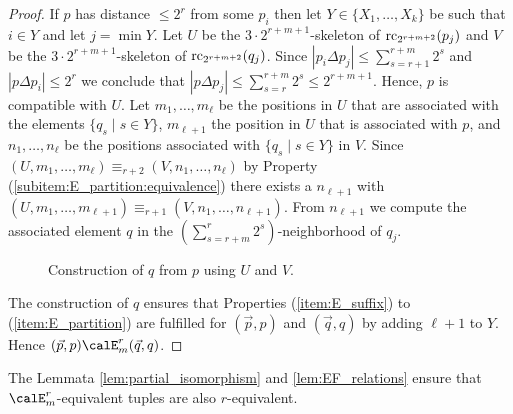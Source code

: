 \begin{proof}
	
	If $p$ has distance $\leq 2^{r}$ from some $p_i$ then let $Y\in \{X_1,\ldots,X_k\}$ be such that $i\in Y$ and let $j=\min Y$. Let $U$ be the $3\cdot 2^{r+m+1}$-skeleton of $\operatorname{rc}_{2^{r+m+2}}(p_j)$ and 
	$V$ be the $3\cdot 2^{r+m+1}$-skeleton of $\operatorname{rc}_{2^{r+m+2}}(q_j)$.
	Since $|p_i\Delta p_j| \leq \sum_{s=r+1}^{r+m} 2^s$ and $|p\Delta p_i| \leq 2^r$ we conclude that $|p\Delta p_j| \leq \sum_{s=r}^{r+m} 2^s \leq 2^{r+m+1}$. Hence, $p$ is compatible with $U$. Let $m_1,\ldots,m_\ell$ be the positions in $U$ that are associated with the elements $\{q_s \mid s\in Y\}$, $m_{\ell+1}$ the position in $U$ that is associated with $p$, and $n_1,\ldots,n_\ell$ be the positions associated with $\{q_s \mid s\in Y\}$ in $V$. Since $(U,m_1,\ldots,m_\ell) \equiv_{r+2} (V,n_1,\ldots,n_\ell)$ by Property (\ref{subitem:E_partition:equivalence}) there exists a $n_{\ell+1}$ with $(U,m_1,\ldots,m_{\ell+1}) \equiv_{r+1} (V,n_1,\ldots,n_{\ell+1})$. From $n_{\ell+1}$ we compute the associated element $q$
	in the $(\sum_{s= r+m}^{r} 2^s)$-neighborhood of $q_j$.
	\begin{figure}[h]
		\centering
		\caption{\label{fig:construction}Construction of $q$ from $p$ using $U$ and $V$.}
	\end{figure}
	The construction of $q$ ensures that Properties (\ref{item:E_suffix}) to (\ref{item:E_partition}) are fulfilled for $(\vec{p}, p)$ and $(\vec{q}, q)$ by adding $\ell+1$ to $Y$. Hence $(\vec{p}, p) \calE^r_m (\vec{q}, q)$.
\end{proof}

The Lemmata \ref{lem:partial_isomorphism} and \ref{lem:EF_relations} ensure that $\calE^r_m$-equivalent tuples are also $r$-equivalent.

